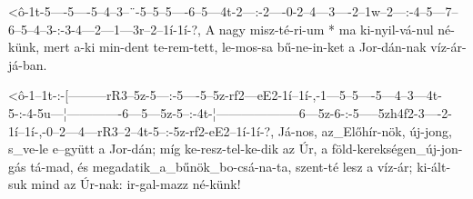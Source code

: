   {<ô-1t-5----5----5--4--3--¨-5--5--5----6--5---4t-2---:-2----0-2--4---3----2--1w--2---:-4--5---7--6--5--4--3-:-3-4---2---1---3r--2--1í-1í-?,}
  {   A  nagy misz-té-ri-um * ma ki-nyil-vá-nul né-künk, mert a-ki min-dent te-rem-tett, le-mos-sa bű-ne-in-ket a Jor-dán-nak víz-ár-já-ban.}

  {<ô-1--1t-:-[---------rR3--5z-5---:-5----5--5z-rf2---eE2-1í--1í-,-1---5--5----5---4--3---4t-5-:-4-5u---¦-------------6---5---5z-5--:-4t-¦--------------------6---5z-6-:-5-----5zh4f2-3----2-1í--1í-,-0--2---4---rR3--2--4t-5--:-5z-rf2-eE2--1í-1í-?,}
  {   Já-nos, az_Előhír-nök, új-jong, s_ve-le e--gyütt a   Jor-dán; míg ke-resz-tel-ke-dik az Úr, a föld-kerekségen_új-jon-gás tá-mad, és megadatik_a_bűnök_bo-csá-na-ta, szent-té     lesz a víz-ár;  ki-ált-suk mind az Úr-nak: ir-gal-mazz né-künk!}